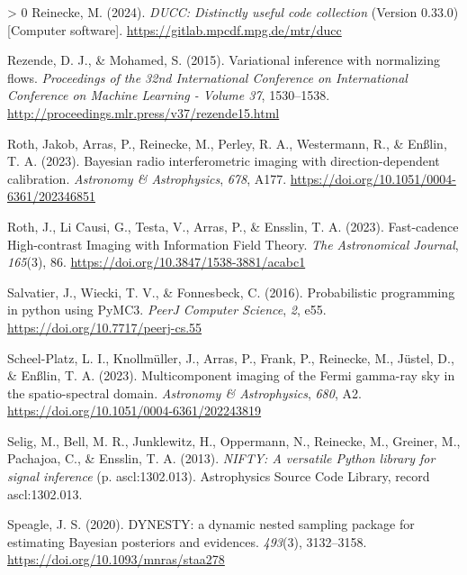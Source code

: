 \documentclass[10pt,a4paper,onecolumn]{article}
\newlength{\cslhangindent}
\newenvironment{CSLReferences}[3] %
 {%
  \setlength{\parindent}{0pt}
  \ifodd #1 \everypar{\setlength{\hangindent}{\cslhangindent}}\ignorespaces\fi
  \ifnum #2 > 0
  \setlength{\parskip}{#2\baselineskip}
  \fi
 }%
 {}
\begin{document}
\begin{CSLReferences}{1}{0}
\leavevmode\hypertarget{ref-ducc0}{}%
Reinecke, M. (2024). \emph{{DUCC}: Distinctly useful code collection}
(Version 0.33.0) {[}Computer software{]}.
\url{https://gitlab.mpcdf.mpg.de/mtr/ducc}

\leavevmode\hypertarget{ref-Rezende2015}{}%
Rezende, D. J., \& Mohamed, S. (2015). Variational inference with
normalizing flows. \emph{Proceedings of the 32nd International
Conference on International Conference on Machine Learning - Volume 37},
1530--1538. \url{http://proceedings.mlr.press/v37/rezende15.html}

\leavevmode\hypertarget{ref-Roth2023DirectionDependentCalibration}{}%
Roth, Jakob, Arras, P., Reinecke, M., Perley, R. A., Westermann, R., \&
Enßlin, T. A. (2023). {Bayesian radio interferometric imaging with
direction-dependent calibration}. \emph{Astronomy \& Astrophysics},
\emph{678}, A177. \url{https://doi.org/10.1051/0004-6361/202346851}

\leavevmode\hypertarget{ref-Roth2023FastCadenceHighContrastImaging}{}%
Roth, J., Li Causi, G., Testa, V., Arras, P., \& Ensslin, T. A. (2023).
{Fast-cadence High-contrast Imaging with Information Field Theory}.
\emph{The Astronomical Journal}, \emph{165}(3), 86.
\url{https://doi.org/10.3847/1538-3881/acabc1}

\leavevmode\hypertarget{ref-Salvatier2016}{}%
Salvatier, J., Wiecki, T. V., \& Fonnesbeck, C. (2016). Probabilistic
programming in python using PyMC3. \emph{PeerJ Computer Science},
\emph{2}, e55. \url{https://doi.org/10.7717/peerj-cs.55}

\leavevmode\hypertarget{ref-ScheelPlatz2023}{}%
Scheel-Platz, L. I., Knollmüller, J., Arras, P., Frank, P., Reinecke,
M., Jüstel, D., \& Enßlin, T. A. (2023). {Multicomponent imaging of the
Fermi gamma-ray sky in the spatio-spectral domain}. \emph{Astronomy \&
Astrophysics}, \emph{680}, A2.
\url{https://doi.org/10.1051/0004-6361/202243819}

\leavevmode\hypertarget{ref-Selig2013}{}%
Selig, M., Bell, M. R., Junklewitz, H., Oppermann, N., Reinecke, M.,
Greiner, M., Pachajoa, C., \& Ensslin, T. A. (2013). \emph{{NIFTY: A
versatile Python library for signal inference}} (p. ascl:1302.013).
Astrophysics Source Code Library, record ascl:1302.013.

\leavevmode\hypertarget{ref-Speagle2020}{}%
Speagle, J. S. (2020). {DYNESTY: a dynamic nested sampling package for
estimating Bayesian posteriors and evidences}. \emph{493}(3),
3132--3158. \url{https://doi.org/10.1093/mnras/staa278}


\end{CSLReferences}
\end{document}
